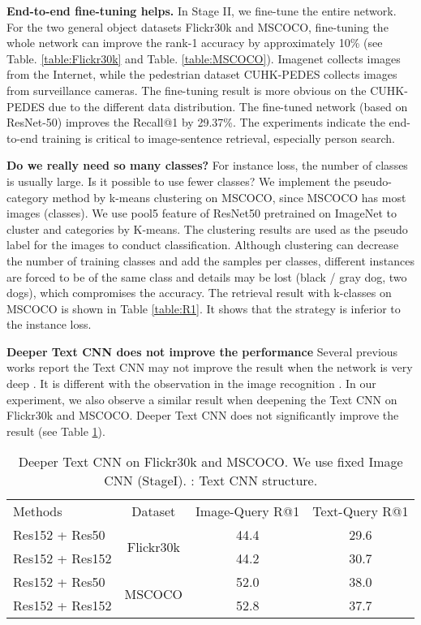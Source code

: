 \documentclass[10pt,final,journal]{IEEEtran}
\begin{document}
\textbf{End-to-end fine-tuning helps.}
In Stage II, we fine-tune the entire network. For the two general object datasets Flickr30k and MSCOCO, fine-tuning the whole network can improve the rank-1 accuracy by approximately 10\% (see Table. \ref{table:Flickr30k} and Table. \ref{table:MSCOCO}). Imagenet collects images from the Internet, while the pedestrian dataset CUHK-PEDES collects images from surveillance cameras. The fine-tuning result is more obvious on the CUHK-PEDES due to the different data distribution. 
The fine-tuned network (based on ResNet-50) improves the Recall@1 by 29.37\%. The experiments indicate the end-to-end training is critical to image-sentence retrieval, especially person search.

\textbf{Do we really need so many classes?}
For instance loss, the number of classes is usually large. Is it possible to use fewer classes? We implement the pseudo-category method by k-means clustering on MSCOCO, since MSCOCO has most images (classes). We use pool5 feature of ResNet50 pretrained on ImageNet to cluster  and  categories by K-means. The clustering results are used as the pseudo label for the images to conduct classification. Although clustering can decrease the number of training classes and add the samples per classes, different instances are forced to be of the same class and details may be lost (black / gray dog, two dogs), which compromises the accuracy. The retrieval result with k-classes on MSCOCO is shown in Table \ref{table:R1}. It shows that the strategy is inferior to the instance loss. 

\textbf{Deeper Text CNN does not improve the performance}
Several previous works report the Text CNN may not improve the result when the network is very deep \cite{le2017convolutional,conneau2017very}. It is different with the observation in the image recognition \cite{he2016deep}. In our experiment, we also observe a similar result when deepening the Text CNN on Flickr30k and MSCOCO. Deeper Text CNN does not significantly improve the result (see Table \ref{table:deeper}). 

\setlength{\tabcolsep}{3pt}
\begin{table}
\footnotesize
\begin{center}
\begin{tabular}{l|c|c|c}
\hline
Methods  & Dataset &Image-Query R@1 &Text-Query R@1\\
\shline
Res152 + Res50  & \multirow{2}{*}{Flickr30k} & 44.4 & 29.6 \\
Res152 + Res152  & & 44.2 & 30.7 \\
\hline
Res152 + Res50  & \multirow{2}{*}{MSCOCO}& 52.0& 38.0\\
Res152 + Res152  & & 52.8 & 37.7\\
\hline
\end{tabular}
\end{center}
\caption{Deeper Text CNN on Flickr30k and MSCOCO. We use fixed Image CNN (StageI). : Text CNN structure.
}
\label{table:deeper}
\end{table}
\end{document}
